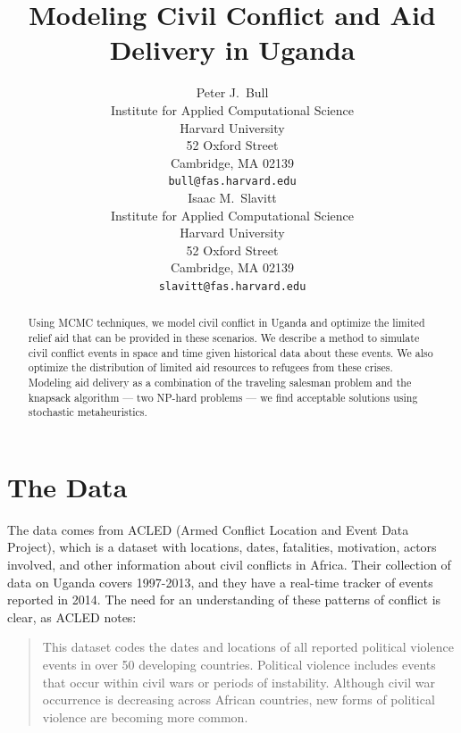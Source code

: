 \documentclass{article} %
\title{Modeling Civil Conflict and Aid Delivery in Uganda}
\author{
Peter J.~Bull \\
Institute for Applied Computational Science\\
Harvard University\\
52 Oxford Street \\
Cambridge, MA 02139 \\
\texttt{bull@fas.harvard.edu} \\
\And
Isaac M.~Slavitt \\
Institute for Applied Computational Science\\
Harvard University\\
52 Oxford Street \\
Cambridge, MA 02139 \\
\texttt{slavitt@fas.harvard.edu} \\
}
\begin{document}
\maketitle

\begin{abstract}
Using MCMC techniques, we model civil conflict in Uganda and optimize the limited relief aid that can be provided in these scenarios. We describe a method to simulate civil conflict events in space and time given historical data about these events. We also optimize the distribution of limited aid resources to refugees from these crises. Modeling aid delivery as a combination of the traveling salesman problem and the knapsack algorithm --- two NP-hard problems --- we find acceptable solutions using stochastic metaheuristics.
\end{abstract}

\section*{The Data}

The data comes from ACLED (Armed Conflict Location and Event Data Project), which is a dataset with locations, dates, fatalities, motivation, actors involved, and other information about civil conflicts in Africa. Their collection of data on Uganda covers 1997-2013, and they have a real-time tracker of events reported in 2014.\cite{ACLED} The need for an understanding of these patterns of conflict is clear, as ACLED notes:

\begin{quote}
This dataset codes the dates and locations of all reported political violence events in over 50 developing countries. Political violence includes events that occur within civil wars or periods of instability. Although civil war occurrence is decreasing across African countries, new forms of political violence are becoming more common.
\end{quote}
\end{document}
